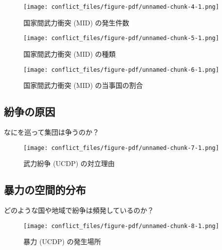 \documentclass[
  xelatex,
  ja=standard]{bxjsarticle}
\begin{document}
\begin{figure}[htpb]

{\centering \texttt{[image: conflict\_files/figure-pdf/unnamed-chunk-4-1.png]}

}

\caption{国家間武力衝突 (MID) の発生件数}

\end{figure}

\begin{figure}[htpb]

{\centering \texttt{[image: conflict\_files/figure-pdf/unnamed-chunk-5-1.png]}

}

\caption{国家間武力衝突 (MID) の種類}

\end{figure}

\begin{figure}[htpb]

{\centering \texttt{[image: conflict\_files/figure-pdf/unnamed-chunk-6-1.png]}

}

\caption{国家間武力衝突 (MID) の当事国の割合}

\end{figure}

\hypertarget{ux7d1bux4e89ux306eux539fux56e0}{%
\subsection{紛争の原因}\label{ux7d1bux4e89ux306eux539fux56e0}}

なにを巡って集団は争うのか？

\begin{figure}[htpb]

{\centering \texttt{[image: conflict\_files/figure-pdf/unnamed-chunk-7-1.png]}

}

\caption{武力紛争 (UCDP) の対立理由}

\end{figure}

\hypertarget{ux66b4ux529bux306eux7a7aux9593ux7684ux5206ux5e03}{%
\subsection{暴力の空間的分布}\label{ux66b4ux529bux306eux7a7aux9593ux7684ux5206ux5e03}}

どのような国や地域で紛争は頻発しているのか？

\begin{figure}[htpb]

{\centering \texttt{[image: conflict\_files/figure-pdf/unnamed-chunk-8-1.png]}

}

\caption{暴力 (UCDP) の発生場所}

\end{figure}
\end{document}
